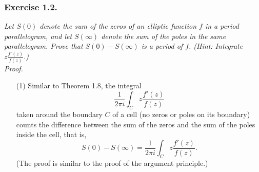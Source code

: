 \documentclass{article}
\begin{document}



\subsubsection*{Exercise 1.2.}
\emph{Let $S(0)$ denote the sum of the zeros of an elliptic function $f$
in a period parallelogram,
and let $S(\infty)$ denote the sum of the poles in the same parallelogram.
Prove that $S(0) - S(\infty)$ is a period of $f$.
(Hint: Integrate $z \frac{f'(z)}{f(z)}$.)} \\



\emph{Proof.}
\begin{enumerate}
\item[(1)]
  Similar to Theorem 1.8,
  the integral
  \[
    \frac{1}{2\pi i} \int_{C} z \frac{f'(z)}{f(z)}
  \]
  taken around the boundary $C$ of a cell (no zeros or poles on its boundary)
  counts the difference between
  the sum of the zeros and the sum of the poles inside the cell, that is,
  \[
    S(0) - S(\infty) = \frac{1}{2\pi i} \int_{C} z \frac{f'(z)}{f(z)}.
  \]
  (The proof is similar to the proof of the argument principle.)


\end{enumerate}
\end{document}
